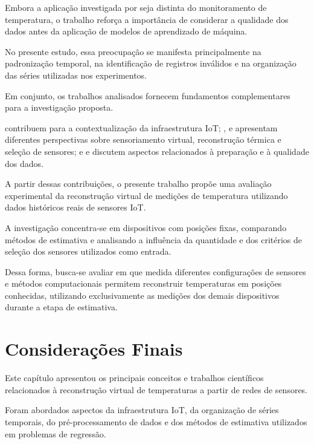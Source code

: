 Embora a aplicação investigada por  seja distinta do monitoramento de temperatura, o trabalho reforça a importância de considerar a qualidade dos dados antes da aplicação de modelos de aprendizado de máquina.

No presente estudo, essa preocupação se manifesta principalmente na padronização temporal, na identificação de registros inválidos e na organização das séries utilizadas nos experimentos.

Em conjunto, os trabalhos analisados fornecem fundamentos complementares para a investigação proposta.

 contribuem para a contextualização da infraestrutura IoT; ,  e  apresentam diferentes perspectivas sobre sensoriamento virtual, reconstrução térmica e seleção de sensores; e  e  discutem aspectos relacionados à preparação e à qualidade dos dados.

A partir dessas contribuições, o presente trabalho propõe uma avaliação experimental da reconstrução virtual de medições de temperatura utilizando dados históricos reais de sensores IoT.

A investigação concentra-se em dispositivos com posições fixas, comparando métodos de estimativa e analisando a influência da quantidade e dos critérios de seleção dos sensores utilizados como entrada.

Dessa forma, busca-se avaliar em que medida diferentes configurações de sensores e métodos computacionais permitem reconstruir temperaturas em posições conhecidas, utilizando exclusivamente as medições dos demais dispositivos durante a etapa de estimativa.


\section{Considerações Finais}
\label{sec:consideracoes_finais_revisao}

Este capítulo apresentou os principais conceitos e trabalhos científicos relacionados à reconstrução virtual de temperaturas a partir de redes de sensores.

Foram abordados aspectos da infraestrutura IoT, da organização de séries temporais, do pré-processamento de dados e dos métodos de estimativa utilizados em problemas de regressão.

